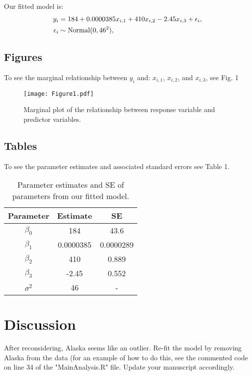 \documentclass{article}\usepackage[]{graphicx}\usepackage[]{color}
\begin{document}

Our fitted model is:
\begin{align}
y_i&=184+0.0000385x_{i,1}+410x_{i,2}-2.45x_{i,3}+\epsilon_i, \notag \\
\epsilon_i &\sim \text{Normal}(0,46^2), \notag
\end{align}


\subsection{Figures}
To see the marginal relationship between $y_i$ and: $x_{i,1}$, $x_{i,2}$, and $x_{i,3}$, see Fig. 1


\begin{figure}
\begin{center}
\texttt{[image: Figure1.pdf]}
\caption{Marginal plot of the relationship between response variable and predictor variables.}
\end{center}
\end{figure}



\subsection{Tables}
To see the parameter estimates and associated standard errors see Table 1.

\begin{table}[H]
\centering
\caption{Parameter estimates and SE of parameters from our fitted model.}
\begin{tabular}[t]{ c c c }
\hline
Parameter & Estimate & SE \\
\hline
 $\beta_0$ & 184 & 43.6 \\ 
 $\beta_1$ & 0.0000385 & 0.0000289 \\  
 $\beta_2$ & 410 & 0.889 \\
 $\beta_3$ & -2.45 & 0.552 \\
 $\sigma^2$ & 46 & - \\
 \hline
 \end{tabular}
\label{tab:estimates}
\end{table}


\section{Discussion}
After reconsidering, Alaska seems like an outlier. Re-fit the model by removing Alaska from the data (for an example of how to do this, see the commented code on line 34 of the "MainAnalysis.R" file. Update your manuscript accordingly.
\end{document}
